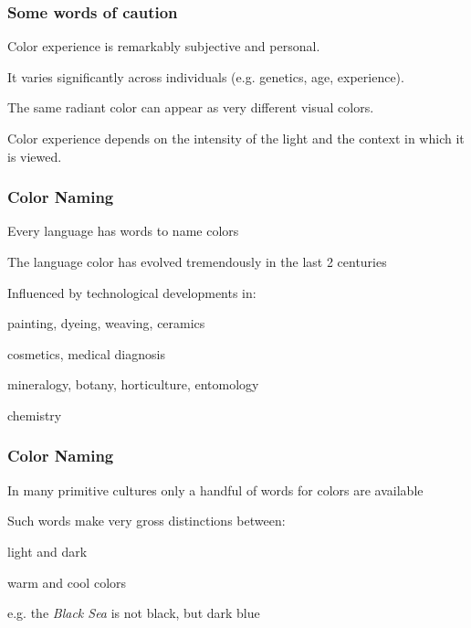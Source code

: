 \documentclass[12pt]{beamer}\usepackage[]{graphicx}\usepackage[]{color}
\begin{document}

\begin{frame}
\frametitle{Some words of caution}

\bbi
  \item Color experience is remarkably subjective and personal.
  \item It varies significantly across individuals 
  (e.g. genetics, age, experience). 
  \item The same radiant color can appear as very different visual colors.
  \item Color experience depends on the intensity of the light and the context 
  in which it is viewed. 
\ei

\end{frame}
  

\begin{frame}
\begin{center}
\Huge{}
\end{center}
\end{frame}


\begin{frame}
\frametitle{Color Naming}

\bbi
  \item Every language has words to name colors
  \item The language color has evolved tremendously in the last 2 centuries
  \item Influenced by technological developments in:
  \bi
    \item painting, dyeing, weaving, ceramics
    \item cosmetics, medical diagnosis
    \item mineralogy, botany, horticulture, entomology
    \item chemistry
  \ei
\ei

\end{frame}
  

\begin{frame}
\frametitle{Color Naming}

\bbi
  \item In many primitive cultures only a handful of words for colors are 
  available
  \item Such words make very gross distinctions between:
  \bi
    \item light and dark
    \item warm and cool colors
  \ei
  \item e.g. the \textit{Black Sea} is not black, but dark blue \\
  {\small {}}
 \ei

\end{frame}
\end{document}
